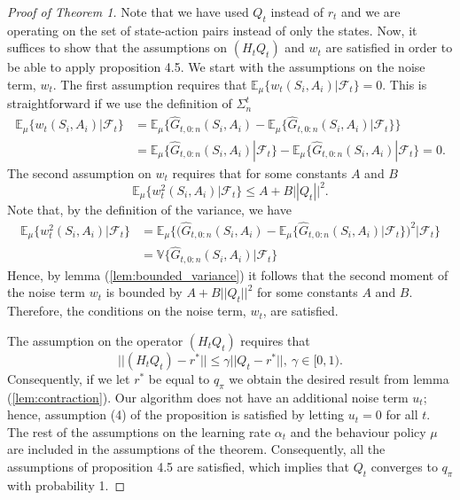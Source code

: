 \begin{proof}[Proof of Theorem 1]
Note that we have used $Q_t$ instead of $r_t$ and we are operating on the set of state-action pairs instead of only the states.
Now, it suffices to show that the assumptions on $(H_t Q_t)$ and $w_t$ are satisfied in order to be able to apply proposition 4.5.
We start with the assumptions on the noise term, $w_t$.
The first assumption requires that $\mathbb{E}_\mu \{ w_t (S_i, A_i) \big| \mathcal{F}_t \} = 0$.
This is straightforward if we use the definition of $\Sigma^t_n$
%
\begin{align*}
\mathbb{E}_\mu \{ w_t (S_i, A_i) \big| \mathcal{F}_t \} &=
	\mathbb{E}_\mu \{ \hat{G}_{t, 0:n}(S_i, A_i) 
    - \mathbb{E}_\mu \{ \hat{G}_{t, 0:n}(S_i, A_i) | \mathcal{F}_t \} \}
    \\
&= \mathbb{E}_\mu \{ \hat{G}_{t, 0:n}(S_i, A_i) | \mathcal{F}_t \} 
	- \mathbb{E}_\mu \{ \hat{G}_{t, 0:n}(S_i, A_i) | \mathcal{F}_t \} = 0.
\end{align*}
%
The second assumption on $w_t$ requires that for some constants $A$ and $B$
%
\begin{equation*}
\mathbb{E}_\mu \{ w^2_t (S_i, A_i) | \mathcal{F}_t \} \leq A + B || Q_t ||^2.
\end{equation*}
%
Note that, by the definition of the variance, we have
%
\begin{align*}
\mathbb{E}_\mu \{ w^2_t (S_i, A_i) | \mathcal{F}_t \} 
	&= \mathbb{E}_\mu \big\{ \big( \hat{G}_{t, 0:n}(S_i, A_i) - 
    \mathbb{E}_\mu \{ \hat{G}_{t, 0:n}(S_i, A_i) | \mathcal{F}_t \} \big)^2 
    \big| \mathcal{F}_t \big\}
    \\
    &= \mathbb{V} \big\{ \hat{G}_{t, 0:n}(S_i, A_i) \big| \mathcal{F}_t  \big\}
\end{align*}
%
Hence, by lemma (\ref{lem:bounded_variance}) it follows that the second moment of the noise term $w_t$ is bounded by $A + B ||Q_t||^2$ for some constants $A$ and $B$.
Therefore, the conditions on the noise term, $w_t$, are satisfied. 

The assumption on the operator $(H_t Q_t)$ requires that
%
\begin{equation*}
|| (H_t Q_t) - r^* || \leq \gamma || Q_t - r^* ||, \ \gamma \in [0, 1).
\end{equation*}
Consequently, if we let $r^*$ be equal to $q_\pi$ we obtain the desired result from lemma (\ref{lem:contraction}). 
Our algorithm does not have an additional noise term $u_t$; hence, assumption (4) of the proposition is satisfied by letting $u_t = 0$ for all $t$.
The rest of the assumptions on the learning rate $\alpha_t$ and the behaviour policy $\mu$ are included in the assumptions of the theorem.
Consequently, all the assumptions of proposition 4.5 are satisfied, which implies that $Q_t$ converges to $q_\pi$ with probability 1. 
\end{proof}

